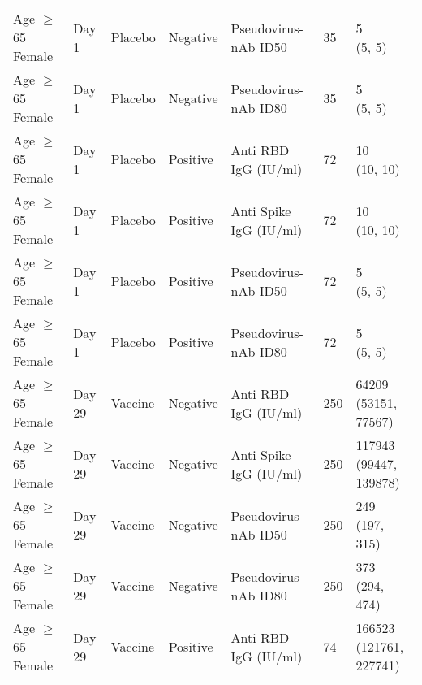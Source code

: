 \documentclass[]{book}
\theoremstyle{definition}
\theoremstyle{definition}
\theoremstyle{definition}
\newcommand{\1}{\mathbbm{1}}
\begin{document}
\begin{landscape}
\begin{ThreePartTable}
\begin{longtable}[t]{>{\raggedright\arraybackslash}p{7cm}llllll}
\hspace{1em}Age $\geq$ 65 Female & Day 1 & Placebo & Negative & Pseudovirus-nAb ID50 & 35 & \makecell[l]{5\\(5, 5)}\\
\hspace{1em}Age $\geq$ 65 Female & Day 1 & Placebo & Negative & Pseudovirus-nAb ID80 & 35 & \makecell[l]{5\\(5, 5)}\\
\hspace{1em}Age $\geq$ 65 Female & Day 1 & Placebo & Positive & Anti RBD IgG (IU/ml) & 72 & \makecell[l]{10\\(10, 10)}\\
\hspace{1em}Age $\geq$ 65 Female & Day 1 & Placebo & Positive & Anti Spike IgG (IU/ml) & 72 & \makecell[l]{10\\(10, 10)}\\
\hspace{1em}Age $\geq$ 65 Female & Day 1 & Placebo & Positive & Pseudovirus-nAb ID50 & 72 & \makecell[l]{5\\(5, 5)}\\
\hspace{1em}Age $\geq$ 65 Female & Day 1 & Placebo & Positive & Pseudovirus-nAb ID80 & 72 & \makecell[l]{5\\(5, 5)}\\
\hspace{1em}Age $\geq$ 65 Female & Day 29 & Vaccine & Negative & Anti RBD IgG (IU/ml) & 250 & \makecell[l]{64209\\(53151, 77567)}\\
\hspace{1em}Age $\geq$ 65 Female & Day 29 & Vaccine & Negative & Anti Spike IgG (IU/ml) & 250 & \makecell[l]{117943\\(99447, 139878)}\\
\hspace{1em}Age $\geq$ 65 Female & Day 29 & Vaccine & Negative & Pseudovirus-nAb ID50 & 250 & \makecell[l]{249\\(197, 315)}\\
\hspace{1em}Age $\geq$ 65 Female & Day 29 & Vaccine & Negative & Pseudovirus-nAb ID80 & 250 & \makecell[l]{373\\(294, 474)}\\
\hspace{1em}Age $\geq$ 65 Female & Day 29 & Vaccine & Positive & Anti RBD IgG (IU/ml) & 74 & \makecell[l]{166523\\(121761, 227741)}\\

\end{longtable}
\end{ThreePartTable}
\end{landscape}
\end{document}
